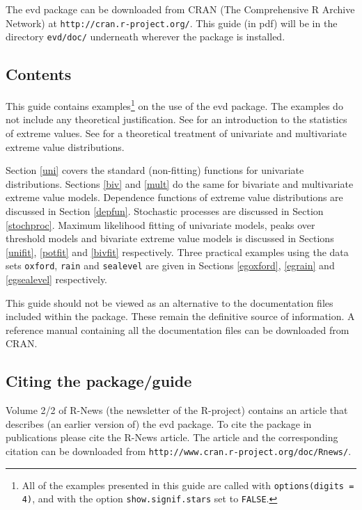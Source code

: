 \documentclass[11pt,a4paper]{article}
\begin{document}
The evd package can be downloaded from CRAN (The Comprehensive R
Archive Network) at \verb+http://cran.r-project.org/+. 
This guide (in pdf) will be in the directory \verb+evd/doc/+
underneath wherever the package is installed.

\subsection{Contents}

This guide contains examples\footnote{All of the examples presented in
this guide are called with \texttt{options(digits = 4)}, and with the
option \texttt{show.signif.stars} set to \texttt{FALSE}.} on the use
of the evd package. 
The examples do not include any theoretical justification.
See \citet{cole01} for an introduction to the statistics of extreme
values. 
See \citet{kotznada00} for a theoretical treatment of univariate and
multivariate extreme value distributions. 

Section \ref{uni} covers the standard (non-fitting) functions for
univariate distributions. 
Sections \ref{biv} and \ref{mult} do the same for bivariate and
multivariate extreme value models. 
Dependence functions of extreme value distributions are discussed in
Section \ref{depfun}. 
Stochastic processes are discussed in Section \ref{stochproc}.
Maximum likelihood fitting of univariate models, peaks over threshold
models and bivariate extreme value models is discussed in Sections
\ref{unifit}, \ref{potfit} and \ref{bivfit} respectively. 
Three practical examples using the data sets \verb+oxford+,
\verb+rain+ and \verb+sealevel+ are given in Sections \ref{egoxford},
\ref{egrain} and \ref{egsealevel} respectively. 

This guide should not be viewed as an alternative to the documentation
files included within the package. 
These remain the definitive source of information. 
A reference manual containing all the documentation files can be
downloaded from CRAN. 

\subsection{Citing the package/guide}

Volume 2/2 of R-News (the newsletter of the R-project) contains an
article that describes (an earlier version of) the evd package. 
To cite the package in publications please cite the R-News article. 
The article and the corresponding citation can be downloaded from
\verb+http://www.cran.r-project.org/doc/Rnews/+. 
\end{document}
